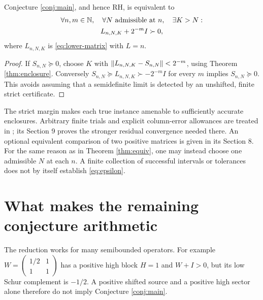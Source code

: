 \begin{corollary}\label{cor:epsilon}
Conjecture \ref{conj:main}, and hence RH, is equivalent to
\begin{equation}\label{eq:epsilon}
\begin{gathered}
\forall n,m\in\mathbb N,\quad\forall N\text{ admissible at }n,\quad\exists K>N:\\
L_{n,N,K}+2^{-m}I\succ0,
\end{gathered}
\end{equation}
where $L_{n,N,K}$ is \eqref{eq:lower-matrix} with $L=n$.
\end{corollary}
\begin{proof}
If $S_{n,N}\succeq0$, choose $K$ with
$\lVert L_{n,N,K}-S_{n,N}\rVert<2^{-m}$, using Theorem \ref{thm:enclosure}.
Conversely $S_{n,N}\succeq L_{n,N,K}\succ-2^{-m}I$ for every $m$ implies
$S_{n,N}\succeq0$. This avoids assuming that a semidefinite limit is detected
by an unshifted, finite strict certificate.
\end{proof}
The strict margin makes each true instance amenable to sufficiently
accurate enclosures. Arbitrary finite trials and explicit column-error
allowances are treated in \cite[Section 10]{Companion}; its Section 9 proves
the stronger residual convergence needed there. An optional equivalent
comparison of two positive matrices is given in its Section 8.
For the same reason as in Theorem \ref{thm:equiv}, one may instead choose
one admissible $N$ at each $n$. A finite collection of successful intervals
or tolerances does not by itself establish
\eqref{eq:epsilon}.

\section{What makes the remaining conjecture arithmetic}
The reduction works for many semibounded operators. For example
$W=\left(\begin{smallmatrix}1/2&1\\1&1\end{smallmatrix}\right)$ has
a positive high block $H=1$ and $W+I>0$, but its low Schur complement is
$-1/2$. A positive shifted source and a positive high sector alone therefore
do not imply Conjecture \ref{conj:main}.

